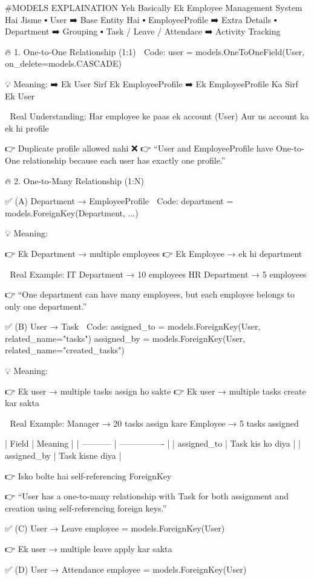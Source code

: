 #MODELS EXPLAINATION
Yeh Basically Ek Employee Management System Hai Jisme
▪️ User ➡️ Base Entity Hai
▪️ EmployeeProfile ➡️ Extra Details
▪️ Department ➡️ Grouping
▪️ Task / Leave / Attendace ➡️ Activity Tracking

🔥 1. One-to-One Relationship (1:1)
📍 Code: user = models.OneToOneField(User, on_delete=models.CASCADE)

💡 Meaning:
➡️  Ek User Sirf Ek EmployeeProfile
➡️  Ek EmployeeProfile Ka Sirf Ek User

🧠 Real Understanding:
Har employee ke paas ek account (User)
Aur us account ka ek hi profile

👉 Duplicate profile allowed nahi ❌
👉 “User and EmployeeProfile have One-to-One relationship because each user has exactly one profile.”

🔥 2. One-to-Many Relationship (1:N)

✅ (A) Department → EmployeeProfile
📍 Code: department = models.ForeignKey(Department, ...)

💡 Meaning:

👉 Ek Department → multiple employees
👉 Ek Employee → ek hi department

🧠 Real Example:
IT Department → 10 employees
HR Department → 5 employees

👉 “One department can have many employees, but each employee belongs to only one department.”

✅ (B) User → Task
📍 Code:
        assigned_to = models.ForeignKey(User, related_name="tasks")
        assigned_by = models.ForeignKey(User, related_name="created_tasks")


💡 Meaning:

👉 Ek user → multiple tasks assign ho sakte
👉 Ek user → multiple tasks create kar sakta

🧠 Real Example:
Manager → 20 tasks assign kare
Employee → 5 tasks assigned

| Field       | Meaning          |
| ----------- | ---------------- |
| assigned_to | Task kis ko diya |
| assigned_by | Task kisne diya  |

👉 Isko bolte hai self-referencing ForeignKey

👉 “User has a one-to-many relationship with Task for both assignment and creation 
    using self-referencing foreign keys.”

✅ (C) User → Leave
employee = models.ForeignKey(User)

👉 Ek user → multiple leave apply kar sakta

✅ (D) User → Attendance
employee = models.ForeignKey(User)

